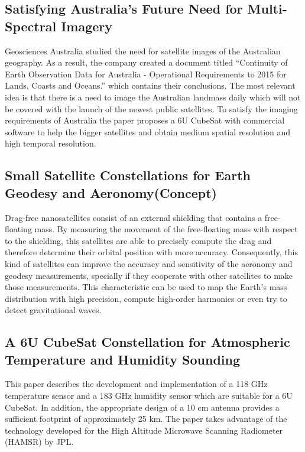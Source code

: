 \subsection{Satisfying Australia's Future Need for Multi-Spectral Imagery}

Geosciences Australia studied the need for satellite images of the Australian geography. As a result, the company created a document titled ``Continuity of Earth Observation Data for Australia - Operational Requirements to 2015 for Lands, Coasts and Oceans.'' which contains their conclusions. The most relevant idea is that there is a need to image the Australian landmass daily which will not be covered with the launch of the newest public satellites. To satisfy the imaging requirements of Australia the paper proposes a 6U CubeSat with commercial software to help the bigger satellites and obtain medium spatial resolution and high temporal resolution. \cite{Stepan_ConstellationImagery}

\subsection{Small Satellite Constellations for Earth Geodesy and Aeronomy(Concept)}

Drag-free nanosatellites consist of an external shielding that contains a free-floating mass. By measuring the movement of the free-floating mass with respect to the shielding, this satellites are able to precisely compute the drag and therefore determine their orbital position with more accuracy. Consequently, this kind of satellites can  improve the accuracy and sensitivity of the aeronomy and geodesy measurements, specially if they cooperate with other satellites to make those measurements. This characteristic can be used to map the Earth's mass distribution
with high precision, compute high-order harmonics or even try to detect gravitational waves.\cite{Conklin_GeoAero_Constellation}

\subsection{A 6U CubeSat Constellation for Atmospheric Temperature and Humidity Sounding}

This paper describes the development and implementation of a 118 GHz temperature sensor and a 183 GHz humidity sensor which are suitable for a 6U CubeSat. In addition, the appropriate design of a 10 cm antenna provides a sufficient footprint of approximately 25 km. The paper takes advantage of the technology developed for the High Altitude Microwave Scanning Radiometer (HAMSR) by JPL. \cite{Sharmila_ContellationTempHumidity}

